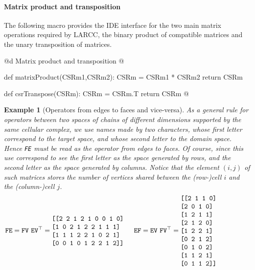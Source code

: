 \documentclass[11pt,oneside]{article}	%
\newtheorem{example}{Example}
\begin{document}
\paragraph{Matrix product and transposition}

The following macro provides the IDE interface for the two main matrix operations required by LARCC, the binary product of compatible matrices and the unary transposition of matrices.

@d Matrix product and transposition
@{def matrixProduct(CSRm1,CSRm2):
    CSRm = CSRm1 * CSRm2
    return CSRm

def csrTranspose(CSRm):
    CSRm = CSRm.T
    return CSRm
@}

\begin{example}[Operators from edges to faces and vice-versa]\label{ex:denseMat}
As a general rule for operators between two spaces of chains of different dimensions supported by the \emph{same} cellular complex, we use names made by two characters, whose first letter correspond to the target space, and whose second letter to the domain space. Hence \texttt{FE} must be read as the operator from edges to faces. Of course, since this use correspond to see the first letter as the space generated by rows, and the second letter as the space generated by columns. Notice that the element $(i,j)$ of such matrices stores the number of vertices shared between the (row-)cell $i$ and the (column-)cell $j$.
\[
\texttt{FE} = \texttt{FV}\ \texttt{EV}^\top = 
\begin{minipage}[c]{0.29\linewidth}
\begin{verbatim}
[[2 2 1 2 1 0 0 1 0]
 [1 0 2 1 2 2 1 1 1]
 [1 1 1 2 2 1 0 2 1]
 [0 0 1 0 1 2 2 1 2]]
\end{verbatim}
\end{minipage}
\qquad
\texttt{EF} = \texttt{EV}\ \texttt{FV}^\top = 
\begin{minipage}[c]{0.29\linewidth}
\begin{verbatim}
[[2 1 1 0]
 [2 0 1 0]
 [1 2 1 1]
 [2 1 2 0]
 [1 2 2 1]
 [0 2 1 2]
 [0 1 0 2]
 [1 1 2 1]
 [0 1 1 2]]
\end{verbatim}
\end{minipage}
\]
\end{example}
\end{document}

